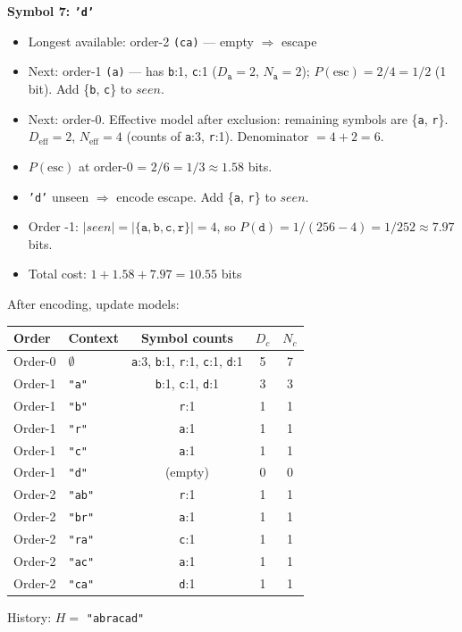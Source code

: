 \begin{examplebox}
\bigskip
\textbf{Symbol 7: \texttt{'d'}}
\begin{itemize}
    \item Longest available: order-2 \texttt{(ca)} — empty $\Rightarrow$ escape
    \item Next: order-1 \texttt{(a)} — has \texttt{b}:1, \texttt{c}:1 ($D_{\texttt{a}}=2$, $N_{\texttt{a}}=2$); $P(\text{esc}) = 2/4 = 1/2$ (1 bit). Add \{\texttt{b}, \texttt{c}\} to $seen$.
    \item Next: order-0. Effective model after exclusion: remaining symbols are \{\texttt{a}, \texttt{r}\}. $D_{\mathrm{eff}} = 2$, $N_{\mathrm{eff}} = 4$ (counts of \texttt{a}:3, \texttt{r}:1). Denominator $= 4+2=6$.
    \item $P(\text{esc})$ at order-0 = $2/6 = 1/3 \approx 1.58$ bits.
    \item \texttt{'d'} unseen $\Rightarrow$ encode escape. Add \{\texttt{a}, \texttt{r}\} to $seen$.
    \item Order -1: $|seen| = |\{\texttt{a}, \texttt{b}, \texttt{c}, \texttt{r}\}| = 4$, so $P(\texttt{d}) = 1/(256-4) = 1/252 \approx 7.97$ bits.
    \item Total cost: $1 + 1.58 + 7.97 = 10.55$ bits
\end{itemize}
After encoding, update models:

\begin{center}
\footnotesize
\begin{tabular}{|l|l|c|c|c|}
\hline
\textbf{Order} & \textbf{Context} & \textbf{Symbol counts} & $D_c$ & $N_c$ \\
\hline
Order-0 & $\emptyset$ & \texttt{a}:3, \texttt{b}:1, \texttt{r}:1, \texttt{c}:1, \texttt{d}:1 & 5 & 7 \\
Order-1 & \texttt{"a"} & \texttt{b}:1, \texttt{c}:1, \texttt{d}:1 & 3 & 3 \\
Order-1 & \texttt{"b"} & \texttt{r}:1 & 1 & 1 \\
Order-1 & \texttt{"r"} & \texttt{a}:1 & 1 & 1 \\
Order-1 & \texttt{"c"} & \texttt{a}:1 & 1 & 1 \\
Order-1 & \texttt{"d"} & (empty) & 0 & 0 \\
Order-2 & \texttt{"ab"} & \texttt{r}:1 & 1 & 1 \\
Order-2 & \texttt{"br"} & \texttt{a}:1 & 1 & 1 \\
Order-2 & \texttt{"ra"} & \texttt{c}:1 & 1 & 1 \\
Order-2 & \texttt{"ac"} & \texttt{a}:1 & 1 & 1 \\
Order-2 & \texttt{"ca"} & \texttt{d}:1 & 1 & 1 \\
\hline
\end{tabular}
\end{center}
History: $H =$ \texttt{"abracad"}


\end{examplebox}
